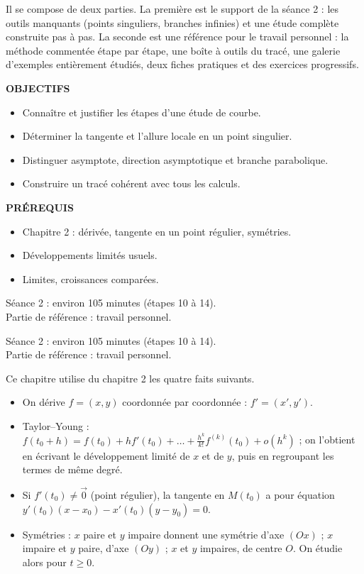 \documentclass[a4paper,11pt]{article}
\numberwithin{equation}{section}
\numberwithin{figure}{section}
\numberwithin{table}{section}
\theoremstyle{enonce}
\theoremstyle{exemple}
\theoremstyle{remarque}
\newcommand{\ouverture}[3]{%
  \begin{tcolorbox}[enhanced,colback=Fond,colframe=Fond,arc=0pt,boxrule=0pt,left=12pt,right=12pt,top=10pt,bottom=10pt,
     before skip=1.2em,after skip=1.6em]
  \begin{minipage}[t]{0.56\linewidth}
  {\sffamily\bfseries\small\color{Bleu}OBJECTIFS}\par\vspace{0.3em}\small #1
  \end{minipage}\hfill
  \begin{minipage}[t]{0.38\linewidth}
  {\sffamily\bfseries\small\color{Bleu}PRÉREQUIS}\par\vspace{0.3em}\small #2
  \ifx\relax#3\relax\else\par\vspace{0.6em}{\sffamily\bfseries\small\color{Bleu}DURÉE}\par\vspace{0.2em}\small #3\fi
  \end{minipage}
  \end{tcolorbox}}
\newcommand{\ve}[1]{\vec{#1}}
\begin{document}
Il se compose de deux parties. La première est le support de la séance 2 : les outils manquants (points singuliers,
branches infinies) et une étude complète construite pas à pas. La seconde est une référence pour le travail
personnel : la méthode commentée étape par étape, une boîte à outils du tracé, une galerie d'exemples entièrement
étudiés, deux fiches pratiques et des exercices progressifs.

\ouverture{%
\begin{itemize}
\item Connaître et justifier les étapes d'une étude de courbe.
\item Déterminer la tangente et l'allure locale en un point singulier.
\item Distinguer asymptote, direction asymptotique et branche parabolique.
\item Construire un tracé cohérent avec tous les calculs.
\end{itemize}}{%
\begin{itemize}
\item Chapitre 2 : dérivée, tangente en un point régulier, symétries.
\item Développements limités usuels.
\item Limites, croissances comparées.
\end{itemize}}{Séance 2 : environ 105 minutes (étapes 10 à 14).\\Partie de référence : travail personnel.}

\begin{commencer}
Ce chapitre utilise du chapitre 2 les quatre faits suivants.
\begin{itemize}
\item On dérive $f=(x,y)$ coordonnée par coordonnée : $f'=(x',y')$.
\item Taylor--Young : $f(t_0+h)=f(t_0)+hf'(t_0)+\dots+\frac{h^k}{k!}f^{(k)}(t_0)+o(h^k)$ ; on l'obtient en écrivant le
      développement limité de $x$ et de $y$, puis en regroupant les termes de même degré.
\item Si $f'(t_0)\neq\ve0$ (point régulier), la tangente en $M(t_0)$ a pour équation $y'(t_0)(x-x_0)-x'(t_0)(y-y_0)=0$.
\item Symétries : $x$ paire et $y$ impaire donnent une symétrie d'axe $(Ox)$ ; $x$ impaire et $y$ paire, d'axe $(Oy)$ ; $x$ et
      $y$ impaires, de centre $O$. On étudie alors pour $t\geq0$.
\end{itemize}
\end{commencer}
\end{document}
